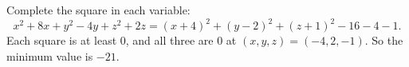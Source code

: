 Complete the square in each variable:
\[x^2+8x+y^2-4y+z^2+2z=(x+4)^2+(y-2)^2+(z+1)^2-16-4-1 .\]
Each square is at least $0$, and all three are $0$ at $(x,y,z)=(-4,2,-1)$. So the minimum value is $\boxed{-21}$.
